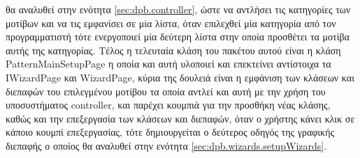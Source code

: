 θα αναλυθεί στην ενότητα \ref{sec:dpb.controller}, ώστε να αντλήσει τις κατηγορίες των μοτίβων και να τις εμφανίσει σε μία λίστα, 
όταν επιλεχθεί μία κατηγορία από τον προγραμματιστή τότε ενεργοποιεί μία δεύτερη λίστα στην οποία προσθέτει 
τα μοτίβα αυτής της κατηγορίας. Τέλος η τελευταία κλάση του πακέτου αυτού είναι η κλάση PatternMainSetupPage 
η οποία και αυτή υλοποιεί και επεκτείνει αντίστοιχα τα IWizardPage και WizardPage, κύρια της δουλειά είναι η εμφάνιση των κλάσεων και διεπαφών 
του επιλεγμένου μοτίβου τα οποία αντλεί και αυτή με την χρήση του υποσυστήματος controller, και παρέχει κουμπιά για την προσθήκη νέας κλάσης, καθώς και 
την επεξεργασία των κλάσεων και διεπαφών, όταν ο χρήστης κάνει κλικ σε κάποιο κουμπί επεξεργασίας, τότε δημιουργείται 
ο δεύτερος οδηγός της γραφικής διεπαφής ο οποίος θα αναλυθεί στην ενότητα \ref{sec:dpb.wizards.setupWizards}.\newpage
